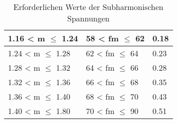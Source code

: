 \begin{table}[ht!]
\begin{tabular}{|l|l|l|}
		1.16 < m $\leq$ 1.24                                                                            & 58 < fm $\leq$ 62                                                                                                    & 0.18                        \\ \hline
		1.24 < m $\leq$ 1.28                                                                            & 62 < fm $\leq$ 64                                                                                                    & 0.23                        \\ \hline
		1.28 < m $\leq$ 1.32                                                                            & 64 < fm $\leq$ 66                                                                                                    & 0.28                        \\ \hline
		1.32 < m $\leq$ 1.36                                                                            & 66 < fm $\leq$ 68                                                                                                    & 0.35                        \\ \hline
		1.36 < m $\leq$ 1.40                                                                             & 68 < fm $\leq$ 70                                                                                                    & 0.43                        \\ \hline
		1.40 < m $\leq$ 1.80                                                                              & 70 < fm $\leq$ 90                                                                                                    & 0.51                        \\ \hline
	\end{tabular}
	\caption{Erforderlichen Werte der Subharmonischen Spannungen}\label{Test3}
\end{table}

